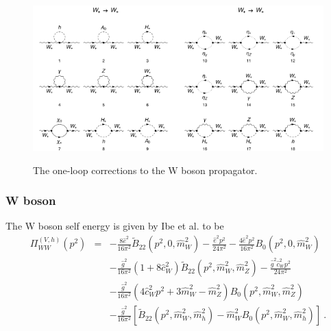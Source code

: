 \documentclass[11pt]{article}
\begin{document}
\begin{figure}[h!]
\center
\includegraphics[width=0.5\textwidth]{diagrams_V[3]_1_1.pdf}\includegraphics[width=0.5\textwidth]{diagrams_V[3]_1_2.pdf}
\caption{The one-loop corrections to the W boson propagator.}\label{fig:WW}
\end{figure}

\subsubsection{W boson}
The W boson self energy is given by Ibe et al. \cite{Ibe2013a} to be
{\small
\begin{eqnarray}
\Pi_{WW}^{(V, h)}(p^2) &=&
-\frac{8\hat{e}^2}{16\pi^2} \tilde B_{22}(p^2, 0, \hat{m}_W^2)
-\frac{\hat{e}^2 p^2}{24\pi^2}
-\frac{4\hat{e}^2 p^2}{16\pi^2} B_0(p^2, 0, \hat{m}_W^2) \nonumber \\
&& -\frac{\hat{g}^2}{16\pi^2}(1 + 8\hat{c}_W^2)
\tilde{B}_{22}(p^2, \hat{m}_W^2, \hat{m}_Z^2)
-\frac{\hat{g}^2 \hat{c}_W^2 p^2}{24\pi^2} \nonumber \\
&& -\frac{\hat g^2}{16\pi^2}( 4 \hat c_W^2 p^2 + 3 \hat m_W^2 - \hat m_Z^2) B_0( p^2, \hat m_W^2, \hat m_Z^2) \nonumber\\
&& -\frac{\hat{g}^2}{16\pi^2}
[ \tilde{B}_{22}(p^2, \hat{m}_W^2, \hat{m}_h^2)
-\hat{m}_W^2 B_0(p^2, \hat{m}_W^2, \hat{m}_h^2) ]\ .\label{eqn:WW}
\end{eqnarray}
}
\end{document}
